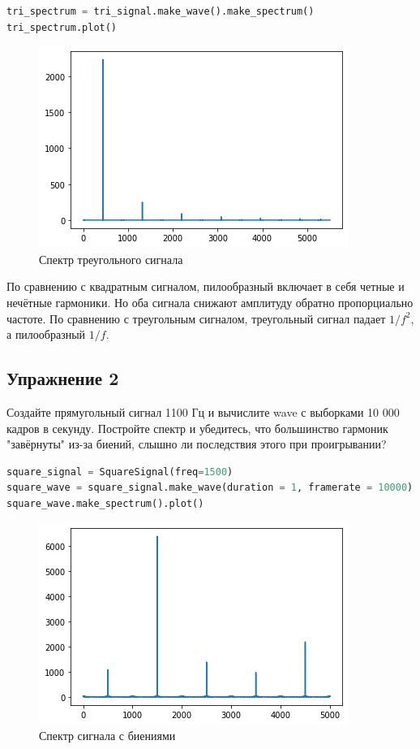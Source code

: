 \begin{lstlisting}[language=Python]
tri_spectrum = tri_signal.make_wave().make_spectrum()
tri_spectrum.plot()
\end{lstlisting}

\begin{figure}[H]
	\begin{center}
		\includegraphics[scale=1]{fig/lab02/lab02_13_0.png}
		\caption{Спектр треугольного сигнала}
	\end{center}
\end{figure}

По сравнению с квадратным сигналом, пилообразный включает в себя четные и нечётные гармоники. Но оба сигнала снижают амплитуду обратно пропорциально частоте.
По сравнению с треугольным сигналом, треугольный сигнал падает $1/f^2$, а пилообразный $1/f$.

\subsection{Упражнение 2}

Создайте прямугольный сигнал 1100 Гц и вычислите wave с выборками 10 000 кадров в секунду. Постройте спектр и убедитесь, что большинство гармоник "завёрнуты" из-за биений, слышно ли последствия этого при проигрывании?

\begin{lstlisting}[language=Python]
square_signal = SquareSignal(freq=1500)
square_wave = square_signal.make_wave(duration = 1, framerate = 10000)
square_wave.make_spectrum().plot()
\end{lstlisting}

\begin{figure}[H]
	\begin{center}
		\includegraphics[scale=1]{fig/lab02/lab02_16_0.png}
		\caption{Спектр сигнала с биениями}
	\end{center}
\end{figure}


